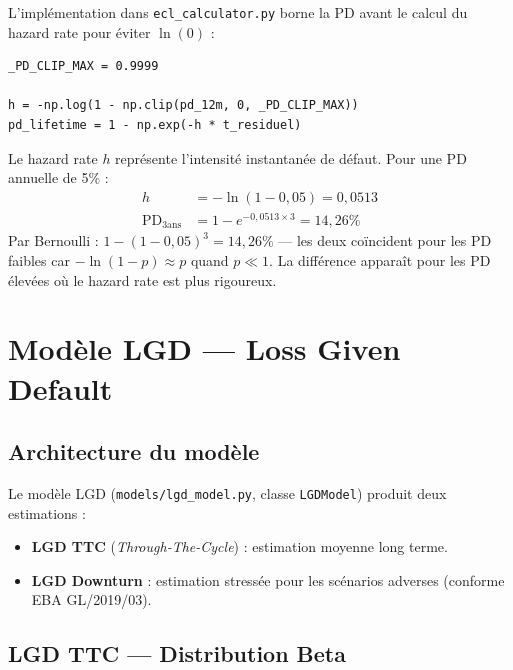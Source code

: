 \documentclass[12pt,a4paper]{article}
\begin{document}
L'impl\'ementation dans \texttt{ecl\_calculator.py} borne la PD avant le calcul du hazard rate pour \'eviter $\ln(0)$ :

\begin{verbatim}
_PD_CLIP_MAX = 0.9999

h = -np.log(1 - np.clip(pd_12m, 0, _PD_CLIP_MAX))
pd_lifetime = 1 - np.exp(-h * t_residuel)
\end{verbatim}

\begin{interpretbox}
Le hazard rate $h$ repr\'esente l'intensit\'e instantan\'ee de d\'efaut. Pour une PD annuelle de 5\% :
\begin{align*}
h &= -\ln(1 - 0{,}05) = 0{,}0513 \\
\text{PD}_{3\text{ans}} &= 1 - e^{-0{,}0513 \times 3} = 14{,}26\%
\end{align*}
Par Bernoulli : $1 - (1-0{,}05)^3 = 14{,}26\%$ --- les deux co\"incident pour les PD faibles car $-\ln(1-p) \approx p$ quand $p \ll 1$. La diff\'erence appara\^it pour les PD \'elev\'ees o\`u le hazard rate est plus rigoureux.
\end{interpretbox}

\newpage
\section{Mod\`ele LGD --- Loss Given Default}
\label{sec:lgd}

\subsection{Architecture du mod\`ele}

Le mod\`ele LGD (\texttt{models/lgd\_model.py}, classe \texttt{LGDModel}) produit deux estimations :
\begin{itemize}
    \item \textbf{LGD TTC} (\textit{Through-The-Cycle}) : estimation moyenne long terme.
    \item \textbf{LGD Downturn} : estimation stress\'ee pour les sc\'enarios adverses (conforme EBA GL/2019/03).
\end{itemize}

\subsection{LGD TTC --- Distribution Beta}
\end{document}
